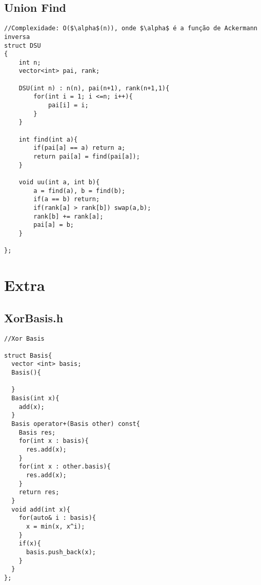 \documentclass[11pt, a4paper, twoside]{article}
\begin{document}
\subsection{Union Find}
\begin{verbatim}
//Complexidade: O($\alpha$(n)), onde $\alpha$ é a função de Ackermann inversa
struct DSU
{
    int n;
    vector<int> pai, rank;
    
    DSU(int n) : n(n), pai(n+1), rank(n+1,1){
        for(int i = 1; i <=n; i++){
            pai[i] = i;
        }
    }
    
    int find(int a){
        if(pai[a] == a) return a;
        return pai[a] = find(pai[a]);
    }
    
    void uu(int a, int b){
        a = find(a), b = find(b);
        if(a == b) return;
        if(rank[a] > rank[b]) swap(a,b);
        rank[b] += rank[a];
        pai[a] = b;
    }
    
};
\end{verbatim}

\pagebreak


%
%

\section{Extra}

\subsection{XorBasis.h}
\begin{verbatim}
//Xor Basis

struct Basis{
  vector <int> basis;
  Basis(){

  }
  Basis(int x){
    add(x);
  }
  Basis operator+(Basis other) const{
    Basis res;
    for(int x : basis){
      res.add(x);
    }
    for(int x : other.basis){
      res.add(x);
    }
    return res;
  }
  void add(int x){
    for(auto& i : basis){
      x = min(x, x^i);
    }
    if(x){
      basis.push_back(x);
    }
  }
};
\end{verbatim}
\end{document}

